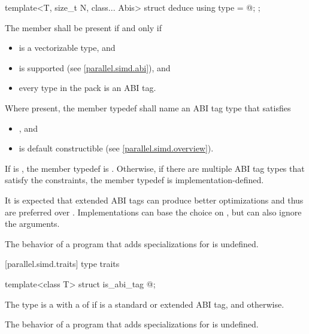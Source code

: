 \begin{itemdecl}
template<T, size_t N, class... Abis> struct deduce { using type = @\seebelow@; };
\end{itemdecl}

\begin{itemdescr}
\pnum
The member  shall be present if and only if
\begin{itemize}
  \item {} is a vectorizable type, and
  \item {} is supported (see \ref{parallel.simd.abi}), and
  \item every type in the  pack is an ABI tag.
\end{itemize}

\pnum
Where present, the member typedef  shall name an ABI tag type that satisfies
\begin{itemize}
  \item {}, and
  \item {} is default constructible (see \ref{parallel.simd.overview}).
\end{itemize}
If  is , the member typedef  is . Otherwise, if there are multiple ABI tag types that satisfy the constraints, the member typedef  is implementation-defined. \begin{note}It is expected that extended ABI tags can produce better optimizations and thus are preferred over .
Implementations can base the choice on , but can also ignore the  arguments.
\end{note}

\pnum
The behavior of a program that adds specializations for  is undefined.
\end{itemdescr}

[parallel.simd.traits]{ type traits}

\begin{itemdecl}
template<class T> struct is_abi_tag { @\seebelow@ };
\end{itemdecl}

\begin{itemdescr}
\pnum
The type  is a  with a  of  if  is a standard or extended ABI tag, and  otherwise.

\pnum
The behavior of a program that adds specializations for  is undefined.
\end{itemdescr}

